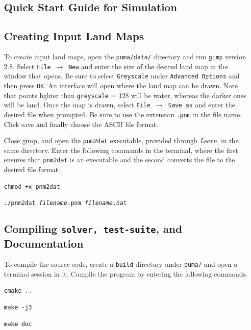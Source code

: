 \documentclass[a4paper,11pt]{article}
\begin{document}
\newpage
\begin{appendices}
\section{Quick Start Guide for Simulation }
\subsection{Creating Input Land Maps}

To create input land maps, open the \texttt{puma/data/} directory and run \texttt{gimp} version 2.8. Select \texttt{File $\rightarrow$ New} and enter the size of the desired land map in the window that opens.  Be sure to select \texttt{Greyscale} under \texttt{Advanced Options} and then press \texttt{OK}. An interface will open where the land map can be drawn. Note that points lighter than \texttt{greyscale} = 128 will be water, whereas the darker ones will be land. Once the map is drawn, select \texttt{File $\rightarrow$ Save as} and enter the desired file when prompted.  Be sure to use the extension \texttt{.pnm} in the file name.  Click save and finally choose the ASCII file format.

Close gimp, and open the \texttt{pnm2dat} executable, provided through \textit{Learn}, in the same directory. Enter the following commands in the terminal, where the first ensures that \texttt{pnm2dat} is an executable and the second converts the file to the desired file format. 

\vspace{5pt}
\noindent \texttt{chmod +x pnm2dat}

\noindent \texttt{./pnm2dat \emph{filename}.pnm  \emph{filename}.dat}
\vspace{5pt}

\subsection{Compiling \texttt{solver, test-suite}, and Documentation}

To compile the source code, create a \texttt{build} directory under \texttt{puma/} and open a terminal session in it. Compile the program by entering the following commands.

\vspace{5pt}
\noindent \texttt{cmake ..}

\noindent \texttt{make -j3}

\noindent\texttt{make doc}
\vspace{5pt}


\end{appendices}
\end{document}
